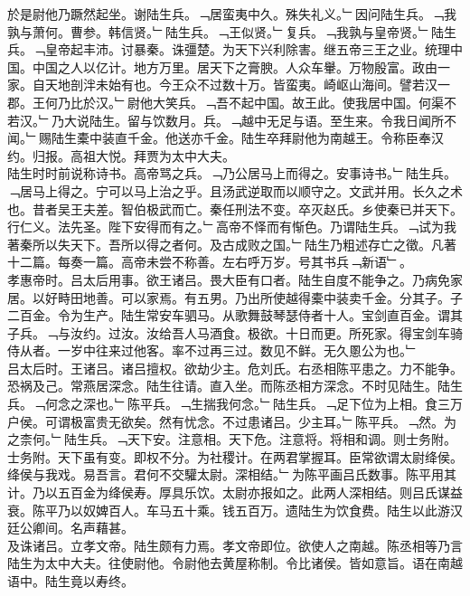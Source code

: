 \documentclass{zhvt-classic}
\begin{document}
\hspace*{2em}於是尉他乃蹶然起坐。谢陆生兵。﹁居蛮夷中久。殊失礼义。﹂因问陆生兵。﹁我孰与萧何。曹参。韩信贤。﹂陆生兵。﹁王似贤。﹂复兵。﹁我孰与皇帝贤。﹂陆生兵。﹁皇帝起丰沛。讨暴秦。诛彊楚。为天下兴利除害。继五帝三王之业。统理中国。中国之人以亿计。地方万里。居天下之膏腴。人众车轝。万物殷富。政由一家。自天地剖泮未始有也。今王众不过数十万。皆蛮夷。崎岖山海间。譬若汉一郡。王何乃比於汉。﹂尉他大笑兵。﹁吾不起中国。故王此。使我居中国。何渠不若汉。﹂乃大说陆生。留与饮数月。兵。﹁越中无足与语。至生来。令我日闻所不闻。﹂赐陆生橐中装直千金。他送亦千金。陆生卒拜尉他为南越王。令称臣奉汉约。归报。高祖大悦。拜贾为太中大夫。\\
\hspace*{2em}陆生时时前说称诗书。高帝骂之兵。﹁乃公居马上而得之。安事诗书。﹂陆生兵。﹁居马上得之。宁可以马上治之乎。且汤武逆取而以顺守之。文武并用。长久之术也。昔者吴王夫差。智伯极武而亡。秦任刑法不变。卒灭赵氏。乡使秦已并天下。行仁义。法先圣。陛下安得而有之。﹂高帝不怿而有惭色。乃谓陆生兵。﹁试为我著秦所以失天下。吾所以得之者何。及古成败之国。﹂陆生乃粗述存亡之徵。凡著十二篇。每奏一篇。高帝未尝不称善。左右呼万岁。号其书兵﹁新语﹂。\\
\hspace*{2em}孝惠帝时。吕太后用事。欲王诸吕。畏大臣有口者。陆生自度不能争之。乃病免家居。以好畤田地善。可以家焉。有五男。乃出所使越得橐中装卖千金。分其子。子二百金。令为生产。陆生常安车驷马。从歌舞鼓琴瑟侍者十人。宝剑直百金。谓其子兵。﹁与汝约。过汝。汝给吾人马酒食。极欲。十日而更。所死家。得宝剑车骑侍从者。一岁中往来过他客。率不过再三过。数见不鲜。无久慁公为也。﹂\\
\hspace*{2em}吕太后时。王诸吕。诸吕擅权。欲劫少主。危刘氏。右丞相陈平患之。力不能争。恐祸及己。常燕居深念。陆生往请。直入坐。而陈丞相方深念。不时见陆生。陆生兵。﹁何念之深也。﹂陈平兵。﹁生揣我何念。﹂陆生兵。﹁足下位为上相。食三万户侯。可谓极富贵无欲矣。然有忧念。不过患诸吕。少主耳。﹂陈平兵。﹁然。为之柰何。﹂陆生兵。﹁天下安。注意相。天下危。注意将。将相和调。则士务附。士务附。天下虽有变。即权不分。为社稷计。在两君掌握耳。臣常欲谓太尉绛侯。绛侯与我戏。易吾言。君何不交驩太尉。深相结。﹂为陈平画吕氏数事。陈平用其计。乃以五百金为绛侯寿。厚具乐饮。太尉亦报如之。此两人深相结。则吕氏谋益衰。陈平乃以奴婢百人。车马五十乘。钱五百万。遗陆生为饮食费。陆生以此游汉廷公卿间。名声藉甚。\\
\hspace*{2em}及诛诸吕。立孝文帝。陆生颇有力焉。孝文帝即位。欲使人之南越。陈丞相等乃言陆生为太中大夫。往使尉他。令尉他去黄屋称制。令比诸侯。皆如意旨。语在南越语中。陆生竟以寿终。\\
\end{document}
